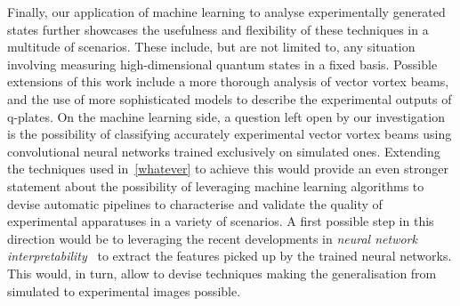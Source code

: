 \documentclass[12pt,twoside]{report}
\begin{document}
Finally, our application of machine learning to analyse experimentally generated states further showcases the usefulness and flexibility of these techniques in a multitude of scenarios.
These include, but are not limited to, any situation involving measuring high-dimensional quantum states in a fixed basis.
Possible extensions of this work include a more thorough analysis of vector vortex beams, and the use of more sophisticated models to describe the experimental outputs of q-plates.
On the machine learning side, a question left open by our investigation is the possibility of classifying accurately experimental vector vortex beams using convolutional neural networks trained exclusively on simulated ones.
Extending the techniques used in~\cref{whatever} to achieve this would provide an even stronger statement about the possibility of leveraging machine learning algorithms to devise automatic pipelines to characterise and validate the quality of experimental apparatuses in a variety of scenarios.
A first possible step in this direction would be to leveraging the recent developments in \emph{neural network interpretability}~\cite{olah2018the} to extract the features picked up by the trained neural networks. This would, in turn, allow to devise techniques making the generalisation from simulated to experimental images possible.



\end{document}
